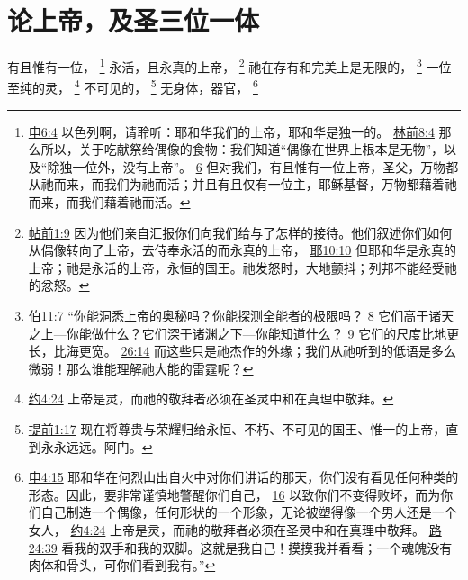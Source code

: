 \documentclass[12pt, a4paper, oneside]{ctexart}
\newcounter{parnum}[section]
\newcommand{\N}{%
   \noindent\refstepcounter{parnum}%
    \makebox[\parindent][l]{\textbf{\arabic{parnum}.}}}
\begin{document}
\section{论上帝，及圣三位一体}

\N 有且惟有一位，
	\footnote {
		\href{https://biblehub.com/deuteronomy/6-4.htm}{申6:4} 以色列啊，请聆听：耶和华我们的上帝，耶和华是独一的。
		\href{https://biblehub.com/1_corinthians/8-4.htm}{林前8:4} 那么所以，关于吃献祭给偶像的食物：我们知道“偶像在世界上根本是无物”，以及“除独一位外，没有上帝”。
		\href{https://biblehub.com/1_corinthians/8-6.htm}{6} 但对我们，有且惟有一位上帝，圣父，万物都从祂而来，而我们为祂而活；并且有且仅有一位主，耶稣基督，万物都藉着祂而来，而我们藉着祂而活。
	}
	永活，且永真的上帝，
	\footnote {
		\href{https://biblehub.com/1_thessalonians/1-9.htm}{帖前1:9} 因为他们亲自汇报你们向我们给与了怎样的接待。他们叙述你们如何从偶像转向了上帝，去侍奉永活的而永真的上帝，
		\href{https://biblehub.com/jeremiah/10-10.htm}{耶10:10} 但耶和华是永真的上帝；祂是永活的上帝，永恒的国王。祂发怒时，大地颤抖；列邦不能经受祂的忿怒。
	}
	祂在存有和完美上是无限的，
	\footnote {
		\href{https://biblehub.com/job/11-7.htm}{伯11:7} “你能洞悉上帝的奥秘吗？你能探测全能者的极限吗？
		\href{https://biblehub.com/job/11-8.htm}{8} 它们高于诸天之上---你能做什么？它们深于诸渊之下---你能知道什么？
		\href{https://biblehub.com/job/11-9.htm}{9} 它们的尺度比地更长，比海更宽。
		\href{https://biblehub.com/job/26-14.htm}{26:14} 而这些只是祂杰作的外缘；我们从祂听到的低语是多么微弱！那么谁能理解祂大能的雷霆呢？
	}
	一位至纯的灵，
	\footnote {
		\href{https://biblehub.com/john/4-24.htm}{约4:24} 上帝是灵，而祂的敬拜者必须在圣灵中和在真理中敬拜。
	}
	不可见的，
	\footnote {
		\href{https://biblehub.com/1_timothy/1-17.htm}{提前1:17} 现在将尊贵与荣耀归给永恒、不朽、不可见的国王、惟一的上帝，直到永永远远。阿门。
	}
	无身体，器官，
	\footnote {
		\href{https://biblehub.com/deuteronomy/4-15.htm}{申4:15} 耶和华在何烈山出自火中对你们讲话的那天，你们没有看见任何种类的形态。因此，要非常谨慎地警醒你们自己，
		\href{https://biblehub.com/deuteronomy/4-16.htm}{16} 以致你们不变得败坏，而为你们自己制造一个偶像，任何形状的一个形象，无论被塑得像一个男人还是一个女人，
		\href{https://biblehub.com/john/4-24.htm}{约4:24} 上帝是灵，而祂的敬拜者必须在圣灵中和在真理中敬拜。
		\href{https://biblehub.com/luke/24-39.htm}{路24:39} 看我的双手和我的双脚。这就是我自己！摸摸我并看看；一个魂魄没有肉体和骨头，可你们看到我有。”
	}
\end{document}
